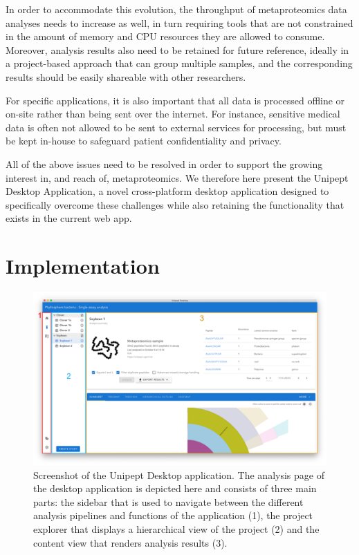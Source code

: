 In order to accommodate this evolution, the throughput of metaproteomics
data analyses needs to increase as well, in turn requiring tools that
are not constrained in the amount of memory and CPU resources they are
allowed to consume. Moreover, analysis results also need to be retained
for future reference, ideally in a project-based approach that can group
multiple samples, and the corresponding results should be easily
shareable with other researchers.

For specific applications, it is also important that all data is
processed offline or on-site rather than being sent over the internet.
For instance, sensitive medical data is often not allowed to be sent to
external services for processing, but must be kept in-house to safeguard
patient confidentiality and privacy.

All of the above issues need to be resolved in order to support the
growing interest in, and reach of, metaproteomics. We therefore here
present the Unipept Desktop Application, a novel cross-platform desktop
application designed to specifically overcome these challenges while
also retaining the functionality that exists in the current web app.

\hypertarget{implementation}{%
\section{Implementation}\label{implementation}}

\begin{figure}
\centering
\includegraphics{resources/figures/chapter2_application_overview_screenshot.png}
\caption{Screenshot of the Unipept Desktop application. The analysis
page of the desktop application is depicted here and consists of three
main parts: the sidebar that is used to navigate between the different
analysis pipelines and functions of the application (1), the project
explorer that displays a hierarchical view of the project (2) and the
content view that renders analysis results (3).}
\end{figure}

